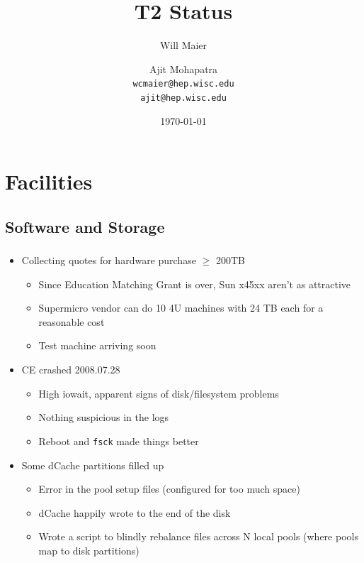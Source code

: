 \documentclass{beamer}
\title{T2 Status}
\author[Maier, Mohapatra]{
    Will Maier \and Ajit Mohapatra\\ 
    {\tt wcmaier@hep.wisc.edu}\\
    {\tt ajit@hep.wisc.edu}}
\institute[Wisconsin]{University of Wisconsin - High Energy Physics}
\date{\today}
\begin{document}
\begin{frame}
    \titlepage
\end{frame}



\section{Facilities}
\subsection{Software and Storage}
\begin{frame}
\frametitle{}
\begin{itemize}
    \item Collecting quotes for hardware purchase $\ge$ 200TB 
    \begin{itemize}
        \item Since Education Matching Grant is over, Sun x45xx aren't as attractive
        \item Supermicro vendor can do 10 4U machines with 24 TB each for a reasonable cost
        \item Test machine arriving soon
    \end{itemize}
    \item CE crashed 2008.07.28
    \begin{itemize}
        \item High iowait, apparent signs of disk/filesystem problems
        \item Nothing suspicious in the logs
        \item Reboot and {\tt fsck} made things better
    \end{itemize}
    \item Some dCache partitions filled up
    \begin{itemize}
        \item Error in the pool setup files (configured for too much space)
        \item dCache happily wrote to the end of the disk
        \item Wrote a script to blindly rebalance files across N local pools (where pools map to disk partitions)
    \end{itemize}
\end{itemize}
\end{frame}
\end{document}
